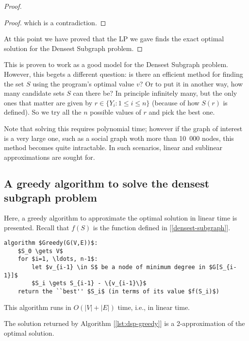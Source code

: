 \begin{proof}
\begin{proof}
        which is a contradiction.
    \end{proof}
    At this point we have proved that the LP we gave finds the exact optimal solution for the Densest Subgraph problem.
\end{proof}

This \lp{} is proven to work as a good model for the Densest Subgraph problem. However, this begets a different question: is there an efficient method for finding the set $S$ using the program's optimal value $v$? Or to put it in another way, how many candidate sets $S$ can there be? In principle infinitely many, but the only ones that matter are given by $r \in \{Y_i : 1 \leq i \leq n\}$ (because of how $S(r)$ is defined). So we try all the $n$ possible values of $r$ and pick the best one.

Note that solving this \lp{} requires polynomial time; however if the graph of interest is a very large one, such as a social graph woth more than 10\ 000 nodes, this method becomes quite intractable. In such scenarios, linear and sublinear approximations are sought for.


\subsection{A greedy algorithm to solve the densest subgraph problem}\label{sec:dsp-greedy}

Here, a greedy algorithm to approximate the optimal solution in linear time is presented. Recall that $f(S)$ is the function defined in [\ref{densest-subgraph}].

\begin{lstlisting}[caption = {The Greedy algorithm to solve the densest subgraph problem}, label = {lst:dsp-greedy}]
algorithm $Greedy(G(V,E))$:
    $S_0 \gets V$
    for $i=1, \ldots, n-1$:
        let $v_{i-1} \in S$ be a node of minimum degree in $G[S_{i-1}]$
        $S_i \gets S_{i-1} - \{v_{i-1}\}$
    return the ``best'' $S_i$ (in terms of its value $f(S_i)$)
\end{lstlisting}

\begin{obs}
    This algorithm runs in $O(|V| + |E|)$ time, i.e., in linear time.
\end{obs}

\begin{thm}\label{thm:dsp-greedy}
    The solution returned by Algorithm [\ref{lst:dsp-greedy}] is a 2-approximation of the optimal solution.
\end{thm}

